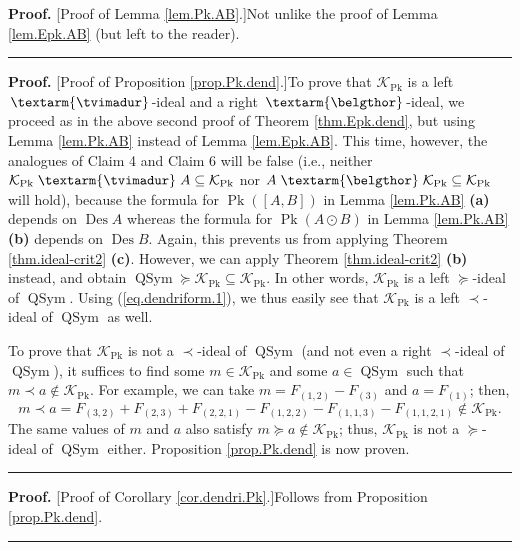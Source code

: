 \documentclass[numbers=enddot,12pt,final,onecolumn,notitlepage]{scrartcl}%
\theoremstyle{definition}
\newenvironment{proof}[1][Proof]{\noindent\textbf{#1.} }{\ \rule{0.5em}{0.5em}}
\newenvironment{verlong}{}{}
\newcommand{\tvi}{\left. \textarm{\tvimadur} \right.}
\newcommand{\bel}{\left. \textarm{\belgthor} \right.}
\begin{document}
\begin{verlong}
\begin{proof}
[Proof of Lemma \ref{lem.Pk.AB}.]Not unlike the proof of Lemma
\ref{lem.Epk.AB} (but left to the reader).
\end{proof}

\begin{proof}
[Proof of Proposition \ref{prop.Pk.dend}.]To prove that $\mathcal{K}%
_{\operatorname*{Pk}}$ is a left $\tvi$-ideal and a right $\bel$-ideal, we
proceed as in the above second proof of Theorem \ref{thm.Epk.dend}, but using
Lemma \ref{lem.Pk.AB} instead of Lemma \ref{lem.Epk.AB}. This time, however,
the analogues of Claim 4 and Claim 6 will be false (i.e., neither
$\mathcal{K}_{\operatorname*{Pk}}\tvi A\subseteq\mathcal{K}%
_{\operatorname*{Pk}}$ nor $A\bel\mathcal{K}_{\operatorname*{Pk}}%
\subseteq\mathcal{K}_{\operatorname*{Pk}}$ will hold), because the formula for
$\operatorname*{Pk}\left(  \left[  A,B\right]  \right)  $ in Lemma
\ref{lem.Pk.AB} \textbf{(a)} depends on $\operatorname*{Des}A$ whereas the
formula for $\operatorname*{Pk}\left(  A\odot B\right)  $ in Lemma
\ref{lem.Pk.AB} \textbf{(b)} depends on $\operatorname*{Des}B$. Again, this
prevents us from applying Theorem \ref{thm.ideal-crit2} \textbf{(c)}. However,
we can apply Theorem \ref{thm.ideal-crit2} \textbf{(b)} instead, and obtain
$\operatorname*{QSym}\left.  \succeq\right.  \mathcal{K}_{\operatorname*{Pk}%
}\subseteq\mathcal{K}_{\operatorname*{Pk}}$. In other words, $\mathcal{K}%
_{\operatorname*{Pk}}$ is a left $\left.  \succeq\right.  $-ideal of
$\operatorname*{QSym}$. Using (\ref{eq.dendriform.1}), we thus easily see that
$\mathcal{K}_{\operatorname*{Pk}}$ is a left $\left.  \prec\right.  $-ideal of
$\operatorname*{QSym}$ as well.

To prove that $\mathcal{K}_{\operatorname*{Pk}}$ is not a $\left.
\prec\right.  $-ideal of $\operatorname*{QSym}$ (and not even a right $\left.
\prec\right.  $-ideal of $\operatorname*{QSym}$), it suffices to find some
$m\in\mathcal{K}_{\operatorname*{Pk}}$ and some $a\in\operatorname*{QSym}$
such that $m\left.  \prec\right.  a\notin\mathcal{K}_{\operatorname*{Pk}}$.
For example, we can take $m=F_{\left(  1,2\right)  }-F_{\left(  3\right)  }$
and $a=F_{\left(  1\right)  }$; then,
\[
m\left.  \prec\right.  a=F_{\left(  3,2\right)  }+F_{\left(  2,3\right)
}+F_{\left(  2,2,1\right)  }-F_{\left(  1,2,2\right)  }-F_{\left(
1,1,3\right)  }-F_{\left(  1,1,2,1\right)  }\notin\mathcal{K}%
_{\operatorname*{Pk}}.
\]
The same values of $m$ and $a$ also satisfy $m\left.  \succeq\right.
a\notin\mathcal{K}_{\operatorname*{Pk}}$; thus, $\mathcal{K}%
_{\operatorname*{Pk}}$ is not a $\left.  \succeq\right.  $-ideal of
$\operatorname*{QSym}$ either. Proposition \ref{prop.Pk.dend} is now proven.
\end{proof}

\begin{proof}
[Proof of Corollary \ref{cor.dendri.Pk}.]Follows from Proposition
\ref{prop.Pk.dend}.
\end{proof}
\end{verlong}
\end{document}
